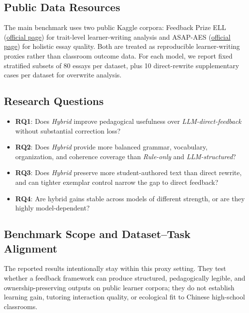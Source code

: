 \documentclass[preprint,12pt]{elsarticle}
\begin{document}
\subsection{Public Data Resources}

The main benchmark uses two public Kaggle corpora: Feedback Prize ELL (\href{https://www.kaggle.com/competitions/feedback-prize-english-language-learning}{official page}) for trait-level learner-writing analysis and ASAP-AES (\href{https://www.kaggle.com/competitions/asap-aes}{official page}) for holistic essay quality. Both are treated as reproducible learner-writing proxies rather than classroom outcome data. For each model, we report fixed stratified subsets of 80 essays per dataset, plus 10 direct-rewrite supplementary cases per dataset for overwrite analysis.

\subsection{Research Questions}

\begin{itemize}
    \item \textbf{RQ1}: Does \textit{Hybrid} improve pedagogical usefulness over \textit{LLM-direct-feedback} without substantial correction loss?
    \item \textbf{RQ2}: Does \textit{Hybrid} provide more balanced grammar, vocabulary, organization, and coherence coverage than \textit{Rule-only} and \textit{LLM-structured}?
    \item \textbf{RQ3}: Does \textit{Hybrid} preserve more student-authored text than direct rewrite, and can tighter exemplar control narrow the gap to direct feedback?
    \item \textbf{RQ4}: Are hybrid gains stable across models of different strength, or are they highly model-dependent?
\end{itemize}

\subsection{Benchmark Scope and Dataset--Task Alignment}

The reported results intentionally stay within this proxy setting. They test whether a feedback framework can produce structured, pedagogically legible, and ownership-preserving outputs on public learner corpora; they do not establish learning gain, tutoring interaction quality, or ecological fit to Chinese high-school classrooms.
\end{document}
